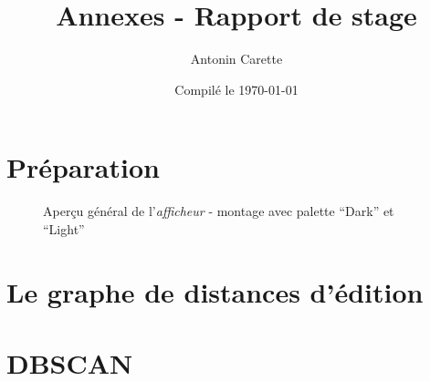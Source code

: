 \documentclass[12pt]{report}
\title{Annexes - Rapport de stage}
\author{Antonin Carette}
\date{Compilé le \today}
\begin{document}
\maketitle

\tableofcontents

\chapter*{Préparation}


\begin{figure}[h]
\begin{center}
\end{center}
\caption{Aperçu général de l'\textit{afficheur} - montage avec palette ``Dark'' et ``Light''}
\end{figure}

\chapter*{Le graphe de distances d'édition}


\chapter*{DBSCAN}

\end{document}
